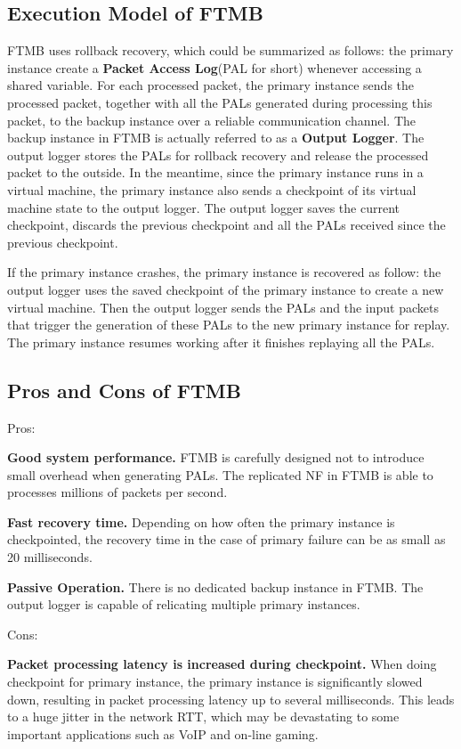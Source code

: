 \subsection{Execution Model of FTMB}

FTMB uses rollback recovery, which could be summarized as follows: the primary
instance create a \textbf{Packet Access Log}(PAL for short) whenever accessing a
shared variable. For each processed packet, the primary instance sends the
processed packet, together with all the PALs generated during processing this
packet, to the backup instance over a reliable communication channel. The backup
instance in FTMB is actually referred to as a \textbf{Output Logger}. The output
logger stores the PALs for rollback recovery and release the processed packet to
the outside. In the meantime, since the primary instance runs in a virtual
machine, the primary instance also sends a checkpoint of its virtual machine
state to the output logger. The output logger saves the current checkpoint,
discards the previous checkpoint and all the PALs received since the previous
checkpoint.

If the primary instance crashes, the primary instance is recovered as follow:
the output logger uses the saved checkpoint of the primary instance to create a
new virtual machine. Then the output logger sends the PALs and the input packets
that trigger the generation of these PALs to the new primary instance for
replay. The primary instance resumes working after it finishes replaying all the
PALs.

\subsection{Pros and Cons of FTMB}

Pros:

\textbf{Good system performance.} FTMB is carefully designed not to introduce
small overhead when generating PALs. The replicated NF in FTMB is able to
processes millions of packets per second.

\textbf{Fast recovery time.} Depending on how often the primary instance is
checkpointed, the recovery time in the case of primary failure can be as small
as 20 milliseconds.

\textbf{Passive Operation.} There is no dedicated backup instance in
FTMB. The output logger is capable of relicating multiple primary instances.

\noindent Cons:

\textbf{Packet processing latency is increased during checkpoint.} When doing
checkpoint for primary instance, the primary instance is significantly slowed
down, resulting in packet processing latency up to several milliseconds. This
leads to a huge jitter in the network RTT, which may be devastating to some
important applications such as VoIP and on-line gaming.


